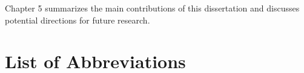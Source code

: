 \documentclass[12pt,reqno,oneside]{amsbook}
\theoremstyle{definition}
\theoremstyle{remark}
\begin{document}
Chapter 5 summarizes the main contributions of this dissertation and discusses potential directions for future research.






\tableofcontents
\listoffigures
\listoftables

\chapter*{List of Abbreviations}
\end{document}
